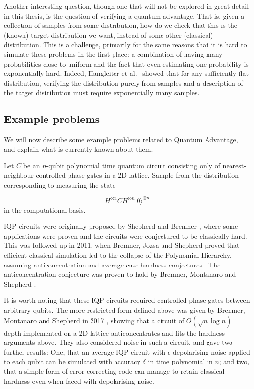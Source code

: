 Another interesting question, though one that will not be explored in great detail in this thesis, is the question of verifying a quantum advantage. That is, given a collection of samples from some distribution, how do we check that this is the (known) target distribution we want, instead of some other (classical) distribution. This is a challenge, primarily for the same reasons that it is hard to simulate these problems in the first place: a combination of having many probabilities close to uniform and the fact that even estimating one probability is exponentially hard. Indeed, Hangleiter et al.~\cite{hangleiter2019} showed that for any sufficiently flat distribution, verifying the distribution purely from samples and a description of the target distribution must require exponentially many samples.

\subsection{Example problems}
\label{ssec:qa-examples}

We will now describe some example problems related to Quantum Advantage, and explain what is currently known about them.

\begin{problem} Let $C$ be an $n$-qubit polynomial time quantum circuit consisting only of nearest-neighbour controlled phase gates in a 2D lattice. Sample from the distribution corresponding to measuring the state

\begin{equation}
H^{\otimes n}CH^{\otimes n}|0\rangle^{\otimes n}
\end{equation}
\noindent in the computational basis.
\end{problem}

IQP circuits were originally proposed by Shepherd and Bremner \cite{shepherd2009thesis, shepherd2009}, where some applications were proven and the circuits were conjectured to be classically hard. This was followed up in 2011, when Bremner, Jozsa and Shepherd proved that efficient classical simulation led to the collapse of the Polynomial Hierarchy, assuming anticoncentration and average-case hardness conjectures \cite{bremner2011}. The anticoncentration conjecture was proven to hold by Bremner, Montanaro and Shepherd \cite{bremner2016}.

It is worth noting that these IQP circuits required controlled phase gates between arbitrary qubits. The more restricted form defined above was given by Bremner, Montanaro and Shepherd in 2017 \cite{bremner2017}, showing that a circuit of $O(\sqrt{n}\log n)$ depth implemented on a 2D lattice anticoncentrates and fits the hardness arguments above. They also considered noise in such a circuit, and gave two further results: One, that an average IQP circuit with $\epsilon$ depolarising noise applied to each qubit can be simulated with accuracy $\delta$ in time polynomial in $n$; and two, that a simple form of error correcting code can manage to retain classical hardness even when faced with depolarising noise.

